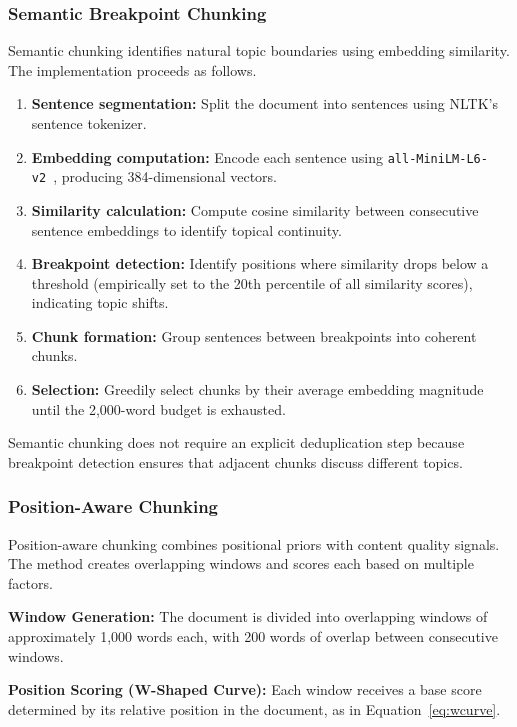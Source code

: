 \documentclass{ieeeaccess}
\begin{document}
\subsubsection{Semantic Breakpoint Chunking}

Semantic chunking identifies natural topic boundaries using embedding similarity. The implementation proceeds as follows.

\begin{enumerate}
    \item \textbf{Sentence segmentation:} Split the document into sentences using NLTK's sentence tokenizer.
    \item \textbf{Embedding computation:} Encode each sentence using \texttt{all-MiniLM-L6-v2}~\cite{b10}, producing 384-dimensional vectors.
    \item \textbf{Similarity calculation:} Compute cosine similarity between consecutive sentence embeddings to identify topical continuity.
    \item \textbf{Breakpoint detection:} Identify positions where similarity drops below a threshold (empirically set to the 20th percentile of all similarity scores), indicating topic shifts.
    \item \textbf{Chunk formation:} Group sentences between breakpoints into coherent chunks.
    \item \textbf{Selection:} Greedily select chunks by their average embedding magnitude until the 2,000-word budget is exhausted.
\end{enumerate}

Semantic chunking does not require an explicit deduplication step because breakpoint detection ensures that adjacent chunks discuss different topics.

\subsubsection{Position-Aware Chunking}

Position-aware chunking combines positional priors with content quality signals. The method creates overlapping windows and scores each based on multiple factors.

\textbf{Window Generation:} The document is divided into overlapping windows of approximately 1,000 words each, with 200 words of overlap between consecutive windows.

\textbf{Position Scoring (W-Shaped Curve):} Each window receives a base score determined by its relative position in the document, as in Equation~\ref{eq:wcurve}.
\end{document}
